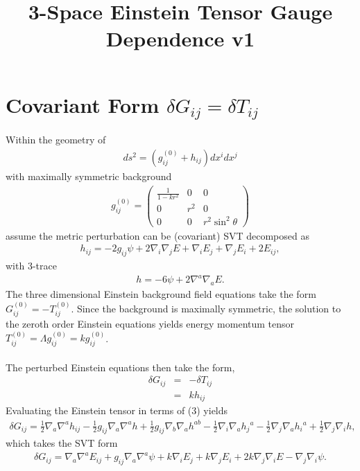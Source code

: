 \documentclass[10pt,letterpaper]{article}
\title{3-Space Einstein Tensor Gauge Dependence v1}
\date{}
\numberwithin{equation}{section}
\begin{document}
 
\maketitle
\noindent 
\section{Covariant Form $\delta G_{ij} = \delta T_{ij}$} 
\label{S1}
Within the geometry of 
\begin{eqnarray}
ds^2 = (g_{ij}^{(0)} + h_{ij})dx^i dx^j 
\end{eqnarray}
with maximally symmetric background
\begin{eqnarray}
g_{ij}^{(0)} = \begin{pmatrix} \frac{1}{1-kr^2} &0&0\\ 0&r^2&0\\0&0&r^2\sin^2\theta\end{pmatrix}
\end{eqnarray}
assume the metric perturbation can be (covariant) SVT decomposed as
\begin{eqnarray}
h_{ij} = -2 g_{ij}\psi + 2\nabla_i\nabla_j E + \nabla_i E_j + \nabla_j E_i + 2E_{ij},
\end{eqnarray}
with 3-trace
\begin{eqnarray}
h = -6 \psi + 2\nabla^a\nabla_a E.
\end{eqnarray}
The three dimensional Einstein background field equations take the form $G_{ij}^{(0)} = -T_{ij}^{(0)}$. Since the background is maximally symmetric, the solution to the zeroth order Einstein equations yields energy momentum tensor $T_{ij}^{(0)} = \Lambda g_{ij}^{(0)} = k g_{ij}^{(0)}$.
\\ \\
The perturbed Einstein equations then take the form,
\begin{eqnarray}
\delta G_{ij} &=& -\delta T_{ij}\\
&=& k h_{ij} 
\end{eqnarray}
Evaluating the Einstein tensor in terms of (3) yields
\begin{eqnarray}
\delta G_{ij}=\tfrac{1}{2} \nabla_{a}\nabla^{a}h_{ij}
 -  \tfrac{1}{2} g_{ij} \nabla_{a}\nabla^{a}h
 + \tfrac{1}{2} g_{ij} \nabla_{b}\nabla_{a}h^{ab}
 -  \tfrac{1}{2} \nabla_{i}\nabla_{a}h_{j}{}^{a}
 -  \tfrac{1}{2} \nabla_{j}\nabla_{a}h_{i}{}^{a}
 + \tfrac{1}{2} \nabla_{j}\nabla_{i}h,
\end{eqnarray}
which takes the SVT form
\begin{eqnarray}
\delta G_{ij}=\nabla_{a}\nabla^{a}E_{ij}
 + g_{ij} \nabla_{a}\nabla^{a}\psi
 + k \nabla_{i}E_{j}
 + k \nabla_{j}E_{i}
 + 2 k \nabla_{j}\nabla_{i}E
 -  \nabla_{j}\nabla_{i}\psi.
\label{dGsvt}
\end{eqnarray}
\end{document}

